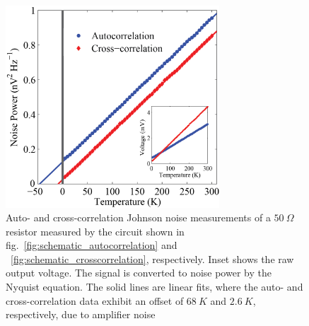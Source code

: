 \begin{figure}
\centering
\includegraphics[width = 80mm]{figures/Johnson_noise_thermometry/Cross_noise_vs_T.png}
\caption{Auto- and cross-correlation Johnson noise measurements of a $50~\Omega$ resistor measured by the circuit shown in fig.~\ref{fig:schematic_autocorrelation} and ~\ref{fig:schematic_crosscorrelation}, respectively. Inset shows the raw output voltage. The signal is converted to noise power by the Nyquist equation. The solid lines are linear fits, where the auto- and cross-correlation data exhibit an offset of $68~K$ and $2.6~K$, respectively, due to amplifier noise}
\label{fig:auto_noise_vs_T}
\end{figure}

